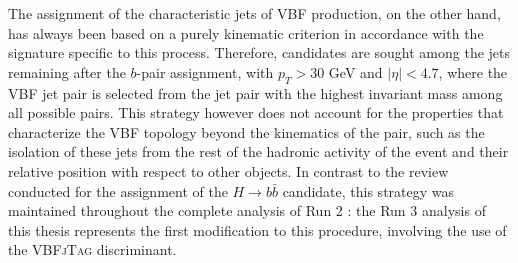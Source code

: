 The assignment of the characteristic jets of VBF production, on the other hand, has always been based on a purely kinematic criterion in accordance with the signature specific to this process. Therefore, candidates are sought among the jets remaining after the $b$-pair assignment, with $p_T > 30$ GeV and $|\eta| < 4.7$, where the VBF jet pair is selected from the jet pair with the highest invariant mass among all possible pairs. This strategy however does not account for the properties that characterize the VBF topology beyond the kinematics of the pair, such as the isolation of these jets from the rest of the hadronic activity of the event and their relative position with respect to other objects. In contrast to the review conducted for the assignment of the $H\rightarrow b\bar{b}$ candidate, this strategy was maintained throughout the complete analysis of Run 2 \cite{CMS-HIG-20-010}: the Run 3 analysis of this thesis \cite{CMS-PAS-HIG-25-008} represents the first modification to this procedure, involving the use of the \textsc{VBFjTag} discriminant.


